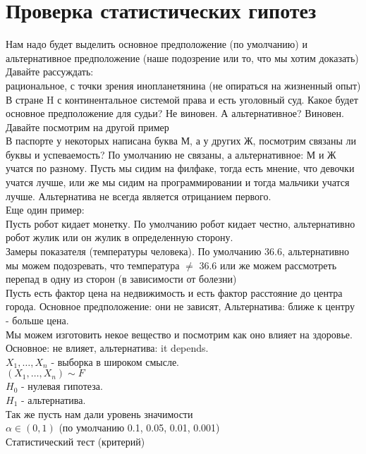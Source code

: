 \documentclass{article}
\newcommand\0{\mathbb{0}}
\newcommand\1{\mathbb{1}}
\begin{document}
\section{Проверка статистических гипотез}
Нам надо будет выделить основное предположение (по умолчанию) и альтернативное предположение (наше подозрение или то, что мы хотим доказать)\\
Давайте рассуждать:\\
рациональное, с точки зрения инопланетянина (не опираться на жизненный опыт)\\
В стране H с континентальное системой права и есть уголовный суд. Какое будет основное предположение для судьи? Не виновен. А альтернативное? Виновен.\\
Давайте посмотрим на другой пример\\
В паспорте у некоторых написана буква М, а у других Ж, посмотрим связаны ли буквы и успеваемость? По умолчанию не связаны, а альтернативное: М и Ж учатся по разному. Пусть мы сидим на филфаке, тогда есть мнение, что девочки учатся лучше, или же мы сидим на программировании и тогда мальчики учатся лучше. Альтернатива не всегда является отрицанием первого.\\
Еще один пример:\\
Пусть робот кидает монетку. По умолчанию робот кидает честно, альтернативно робот жулик или он жулик в определенную сторону.\\
Замеры показателя (температуры человека). По умолчанию 36.6, альтернативно мы можем подозревать, что температура $\neq$ 36.6 или же можем рассмотреть перепад в одну из сторон (в зависимости от болезни)\\
Пусть есть фактор цена на недвижимость и есть фактор расстояние до центра города. Основное предположение: они не зависят, Альтернатива: ближе к центру - больше цена.\\
Мы можем изготовить некое вещество и посмотрим как оно влияет на здоровье. Основное: не влияет, альтернатива: it depends.\\
$X_1, \dots, X_n$ - выборка в широком смысле.\\
$(X_1, \dots, X_n) \sim F$\\
$H_0$ - нулевая гипотеза.\\
$H_1$ - альтернатива.\\
Так же пусть нам дали уровень значимости\\
$\alpha \in (0, 1)$ (по умолчанию 0.1, 0.05, 0.01, 0.001)\\
Статистический тест (критерий)\\
\end{document}
